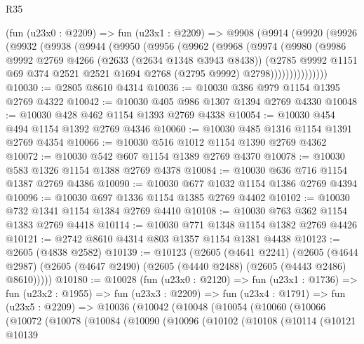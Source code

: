 \begin{lexlean}{R35}
\begin{coremodule}
    (fun (u23x0 : @2209) =>
    fun (u23x1 : @2209) =>
    @9908
      (@9914
        (@9920
          (@9926
            (@9932
              (@9938
                (@9944
                  (@9950
                    (@9956
                      (@9962
                        (@9968
                          (@9974
                            (@9980
                              (@9986
                                @9992
                                @2769
                                @4266
                                (@2633 (@2634 @1348 @3943 @8438))
                                (@2785
                                  @9992
                                  @1151
                                  @69
                                  @374
                                  @2521
                                  @2521
                                  @1694
                                  @2768
                                  (@2795 @9992)
                                  @2798)))))))))))))))
@10030 := @2805 @8610 @4314
@10036 := @10030 @386 @979 @1154 @1395 @2769 @4322
@10042 := @10030 @405 @986 @1307 @1394 @2769 @4330
@10048 := @10030 @428 @462 @1154 @1393 @2769 @4338
@10054 := @10030 @454 @494 @1154 @1392 @2769 @4346
@10060 := @10030 @485 @1316 @1154 @1391 @2769 @4354
@10066 := @10030 @516 @1012 @1154 @1390 @2769 @4362
@10072 := @10030 @542 @607 @1154 @1389 @2769 @4370
@10078 := @10030 @583 @1326 @1154 @1388 @2769 @4378
@10084 := @10030 @636 @716 @1154 @1387 @2769 @4386
@10090 := @10030 @677 @1032 @1154 @1386 @2769 @4394
@10096 := @10030 @697 @1336 @1154 @1385 @2769 @4402
@10102 := @10030 @732 @1341 @1154 @1384 @2769 @4410
@10108 := @10030 @763 @362 @1154 @1383 @2769 @4418
@10114 := @10030 @771 @1348 @1154 @1382 @2769 @4426
@10121 := @2742 @8610 @4314 @803 @1357 @1154 @1381 @4438
@10123 := @2605 (@4838 @2582)
@10139 := @10123
    (@2605
      (@4641 @2241)
      (@2605 (@4644 @2987) (@2605 (@4647 @2490) (@2605 (@4440 @2488) (@2605 (@4443 @2486) @8610)))))
@10180 := @10028
    (fun (u23x0 : @2120) =>
    fun (u23x1 : @1736) =>
    fun (u23x2 : @1955) =>
    fun (u23x3 : @2209) =>
    fun (u23x4 : @1791) =>
    fun (u23x5 : @2209) =>
    @10036
      (@10042
        (@10048
          (@10054
            (@10060
              (@10066
                (@10072
                  (@10078
                    (@10084
                      (@10090
                        (@10096
                          (@10102
                            (@10108
                              (@10114
                                (@10121
                                  @10139

\end{coremodule}
\end{lexlean}
